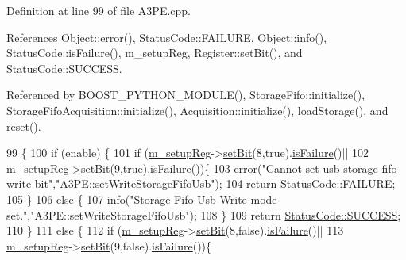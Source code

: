 Definition at line 99 of file A3\+P\+E.\+cpp.



References Object\+::error(), Status\+Code\+::\+F\+A\+I\+L\+U\+RE, Object\+::info(), Status\+Code\+::is\+Failure(), m\+\_\+setup\+Reg, Register\+::set\+Bit(), and Status\+Code\+::\+S\+U\+C\+C\+E\+SS.



Referenced by B\+O\+O\+S\+T\+\_\+\+P\+Y\+T\+H\+O\+N\+\_\+\+M\+O\+D\+U\+L\+E(), Storage\+Fifo\+::initialize(), Storage\+Fifo\+Acquisition\+::initialize(), Acquisition\+::initialize(), load\+Storage(), and reset().


\begin{DoxyCode}
99                                                   \{
100   \textcolor{keywordflow}{if} (enable) \{
101     \textcolor{keywordflow}{if} (\hyperlink{classA3PE_a142fa10b7e705c4701ae21678ec2ec8a}{m\_setupReg}->\hyperlink{classRegister_ab094246dd12aa7e0aa0ca917f4e70b31}{setBit}(8,\textcolor{keyword}{true}).\hyperlink{classStatusCode_a5dd22dc6eb2c52fc4cabc58f6dea2eb7}{isFailure}()||
102         \hyperlink{classA3PE_a142fa10b7e705c4701ae21678ec2ec8a}{m\_setupReg}->\hyperlink{classRegister_ab094246dd12aa7e0aa0ca917f4e70b31}{setBit}(9,\textcolor{keyword}{true}).\hyperlink{classStatusCode_a5dd22dc6eb2c52fc4cabc58f6dea2eb7}{isFailure}())\{
103       \hyperlink{classObject_a204a95f57818c0f811933917a30eff45}{error}(\textcolor{stringliteral}{"Cannot set usb storage fifo write bit"},\textcolor{stringliteral}{"A3PE::setWriteStorageFifoUsb"});
104       \textcolor{keywordflow}{return} \hyperlink{classStatusCode_a6f565cbeadc76d14c72f047e5e85eb4ba3da73d4c469762eb9d3c960368252b26}{StatusCode::FAILURE};
105     \}
106     \textcolor{keywordflow}{else} \{
107       \hyperlink{classObject_a644fd329ea4cb85f54fa6846484b84a8}{info}(\textcolor{stringliteral}{"Storage Fifo Usb Write mode set."},\textcolor{stringliteral}{"A3PE::setWriteStorageFifoUsb"});
108     \}
109     \textcolor{keywordflow}{return} \hyperlink{classStatusCode_a6f565cbeadc76d14c72f047e5e85eb4badd0da38d3ba0d922efd1f4619bc37ad8}{StatusCode::SUCCESS};
110   \}
111   \textcolor{keywordflow}{else} \{
112     \textcolor{keywordflow}{if} (\hyperlink{classA3PE_a142fa10b7e705c4701ae21678ec2ec8a}{m\_setupReg}->\hyperlink{classRegister_ab094246dd12aa7e0aa0ca917f4e70b31}{setBit}(8,\textcolor{keyword}{false}).\hyperlink{classStatusCode_a5dd22dc6eb2c52fc4cabc58f6dea2eb7}{isFailure}()||
113         \hyperlink{classA3PE_a142fa10b7e705c4701ae21678ec2ec8a}{m\_setupReg}->\hyperlink{classRegister_ab094246dd12aa7e0aa0ca917f4e70b31}{setBit}(9,\textcolor{keyword}{false}).\hyperlink{classStatusCode_a5dd22dc6eb2c52fc4cabc58f6dea2eb7}{isFailure}())\{

\end{DoxyCode}
